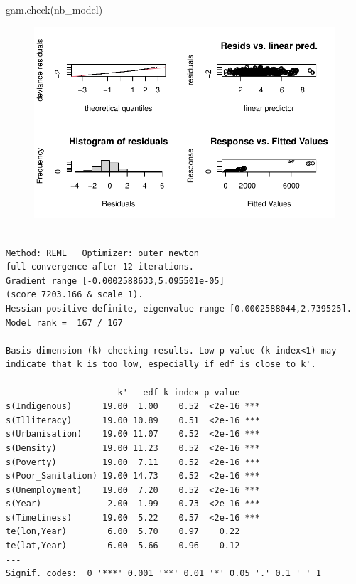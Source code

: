 \documentclass[
  letterpaper,
  DIV=11,
  numbers=noendperiod]{scrartcl}
\newenvironment{Shaded}{\begin{snugshade}}{\end{snugshade}}
\newcommand{\FunctionTok}[1]{\textcolor[rgb]{0.28,0.35,0.67}{#1}}
\newcommand{\NormalTok}[1]{\textcolor[rgb]{0.00,0.23,0.31}{#1}}
\begin{document}
\begin{Shaded}
\begin{Highlighting}[]
\FunctionTok{gam.check}\NormalTok{(nb\_model)}
\end{Highlighting}
\end{Shaded}

\begin{figure}[H]

{\centering \includegraphics{Group34Coursework_files/figure-pdf/unnamed-chunk-14-1.pdf}

}

\end{figure}

\begin{verbatim}

Method: REML   Optimizer: outer newton
full convergence after 12 iterations.
Gradient range [-0.0002588633,5.095501e-05]
(score 7203.166 & scale 1).
Hessian positive definite, eigenvalue range [0.0002588044,2.739525].
Model rank =  167 / 167 

Basis dimension (k) checking results. Low p-value (k-index<1) may
indicate that k is too low, especially if edf is close to k'.

                      k'   edf k-index p-value    
s(Indigenous)      19.00  1.00    0.52  <2e-16 ***
s(Illiteracy)      19.00 10.89    0.51  <2e-16 ***
s(Urbanisation)    19.00 11.07    0.52  <2e-16 ***
s(Density)         19.00 11.23    0.52  <2e-16 ***
s(Poverty)         19.00  7.11    0.52  <2e-16 ***
s(Poor_Sanitation) 19.00 14.73    0.52  <2e-16 ***
s(Unemployment)    19.00  7.20    0.52  <2e-16 ***
s(Year)             2.00  1.99    0.73  <2e-16 ***
s(Timeliness)      19.00  5.22    0.57  <2e-16 ***
te(lon,Year)        6.00  5.70    0.97    0.22    
te(lat,Year)        6.00  5.66    0.96    0.12    
---
Signif. codes:  0 '***' 0.001 '**' 0.01 '*' 0.05 '.' 0.1 ' ' 1
\end{verbatim}
\end{document}
